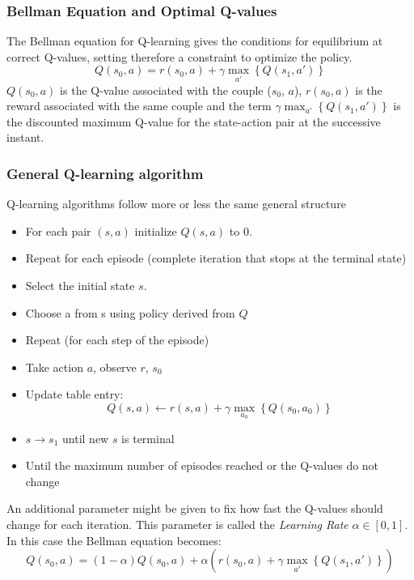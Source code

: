 \subsubsection{Bellman Equation and Optimal Q-values}

The Bellman equation for Q-learning gives the conditions for equilibrium at correct Q-values, setting therefore a constraint to optimize the policy.
\begin{equation}
Q(s_{0}, a) = r(s_{0},a ) + \gamma  \max_{a'}\left\{Q(s_1, a')\right\}
\end{equation}
$Q(s_{0}, a)$ is the Q-value associated with the couple ($s_{0}$, $a$), $r(s_{0},a )$ is the reward associated with the same couple and the term $\gamma \max_{a'}\left\{Q(s_1, a')\right\}$ is the discounted maximum Q-value for the state-action pair at the successive instant.

\subsubsection{General Q-learning algorithm}

Q-learning algorithms follow more or less the same general structure
\begin{itemize}
    \item For each pair $(s, a)$ initialize $Q(s, a)$ to 0.
    \item Repeat for each episode (complete iteration that stops at the terminal state)
    \item Select the initial state $s$.
    \item Choose a from s using policy derived from $Q$
    \item Repeat (for each step of the episode)
    \item Take action $a$, observe $r$, $s_{0}$ 
    \item Update table entry: $$Q(s,a) \leftarrow r(s,a) + \gamma \max_{a_{0}}\left\{Q(s_{0},a_{0})\right\}$$
    \item $s \rightarrow{} s_{1}$ until new $s$ is terminal
    \item Until the maximum number of episodes reached or the Q-values do not change
\end{itemize}

An additional parameter might be given to fix how fast the Q-values should change for each iteration.
This parameter is called the \emph{Learning Rate} $\alpha \in [0,1]$. In this case the Bellman equation becomes:
\begin{equation}
Q(s_{0}, a) = (1-\alpha)Q(s_{0}, a) + \alpha \left(r(s_{0},a ) + \gamma  \max_{a'}\left\{Q(s_1, a')\right\}\right) 
\end{equation}

